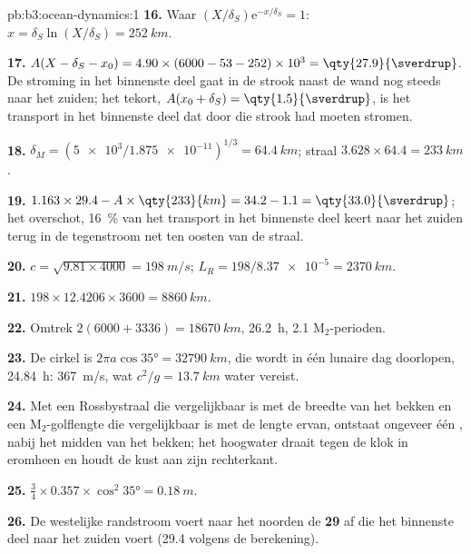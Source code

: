 \begin{solution}{pb:b3:ocean-dynamics:1}
\textbf{16.} Waar $(X/\delta_S)\mathrm e^{-x/\delta_S} = 1$: $x =
\delta_S\ln(X/\delta_S) = \qty{252}{km}$.

\textbf{17.} $A(X - \delta_S - x_0) = 4.90\times(6000 - 53 - 252)\times
10^3 = \qty{27.9}{\sverdrup}$. De stroming in het binnenste deel gaat in de
strook naast de wand nog steeds naar het zuiden; het tekort, $A(x_0 + \delta_S) =
\qty{1.5}{\sverdrup}$, is het transport in het binnenste deel dat door
die strook had moeten stromen.

\textbf{18.} $\delta_M = (\num{5e3}/\num{1.875e-11})^{1/3} = \qty{64.4}{km}$;
straal $3.628\times64.4 = \qty{233}{km}$.

\textbf{19.} $1.163\times29.4 - A\times\qty{233}{km} = 34.2 - 1.1 =
\qty{33.0}{\sverdrup}$; het overschot, \qty{16}{\percent} van het transport in het
binnenste deel keert naar het zuiden terug in de tegenstroom net ten oosten van de straal.

\textbf{20.} $c = \sqrt{9.81\times4000} = \qty{198}{m/s}$; $L_R =
198/\num{8.37e-5} = \qty{2370}{km}$.

\textbf{21.} $198\times12.4206\times3600 = \qty{8860}{km}$.

\textbf{22.} Omtrek $2(6000 + 3336) = \qty{18670}{km}$, \qty{26.2}{h},
2.1 M$_2$-perioden.

\textbf{23.} De cirkel is $2\pi a\cos\ang{35} = \qty{32790}{km}$, die wordt
in één lunaire dag doorlopen, \qty{24.84}{h}: \qty{367}{m/s}, wat $c^2/g =
\qty{13.7}{km}$ water vereist.

\textbf{24.} Met een Rossbystraal die vergelijkbaar is met de breedte van het bekken
en een M$_2$-golflengte die vergelijkbaar is met de lengte ervan, ontstaat ongeveer één , nabij het midden van het bekken; het hoogwater draait tegen de klok in
eromheen en houdt de kust aan zijn rechterkant.

\textbf{25.} $\tfrac34\times0.357\times\cos^2\ang{35} = \qty{0.18}{m}$.

\textbf{26.} De westelijke randstroom voert naar het noorden de
\textbf{\qty[text-series-to-math=true]{29}{\sverdrup}} af die het binnenste deel
naar het zuiden voert (\qty{29.4}{\sverdrup} volgens de berekening).
\end{solution}
